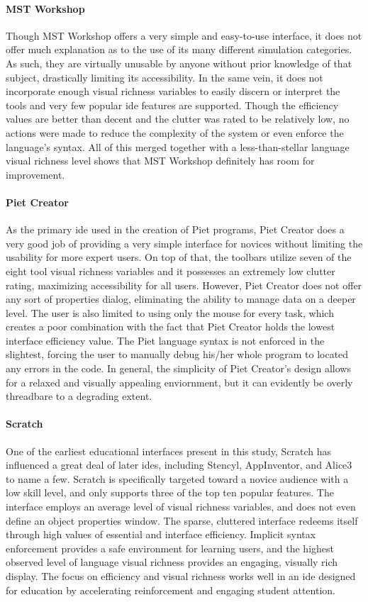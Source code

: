 \paragraph{MST Workshop} Though MST Workshop offers a very simple and easy-to-use interface, it does not offer much explanation as to the use of its many different simulation categories. As such, they are virtually unusable by anyone without prior knowledge of that subject, drastically limiting its accessibility. In the same vein, it does not incorporate enough visual richness variables to easily discern or interpret the tools and very few popular \ac{ide} features are supported. Though the efficiency values are better than decent and the clutter was rated to be relatively low, no actions were made to reduce the complexity of the system or even enforce the language's syntax. All of this merged together with a less-than-stellar language visual richness level shows that MST Workshop definitely has room for improvement.

\paragraph{Piet Creator} As the primary \ac{ide} used in the creation of Piet programs, Piet Creator does a very good job of providing a very simple interface for novices without limiting the usability for more expert users. On top of that, the toolbars utilize seven of the eight tool visual richness variables and it possesses an extremely low clutter rating, maximizing accessibility for all users.  However, Piet Creator does not offer any sort of properties dialog, eliminating the ability to manage data on a deeper level.  The user is also limited to using only the mouse for every task, which creates a poor combination with the fact that Piet Creator holds the lowest interface efficiency value. The Piet language syntax is not enforced in the slightest, forcing the user to manually debug his/her whole program to located any errors in the code. In general, the simplicity of Piet Creator's design allows for a relaxed and visually appealing enviornment, but it can evidently be overly threadbare to a degrading extent. 

\paragraph{Scratch} One of the earliest educational interfaces present in
this study, Scratch has influenced a great deal of later \acp{ide},
including Stencyl, AppInventor, and Alice3 to name a few. Scratch is
specifically targeted toward a novice audience with a low skill level, and
only supports three of the top ten popular features. The interface employs
an average level of visual richness variables, and does not even define an
object properties window. The sparse, cluttered interface redeems itself
through high values of essential and interface efficiency. Implicit syntax
enforcement provides a safe environment for learning users, and the highest
observed level of language visual richness provides an engaging, visually
rich display. The focus on efficiency and visual richness works well in an
\ac{ide} designed for education by accelerating reinforcement and engaging
student attention.

